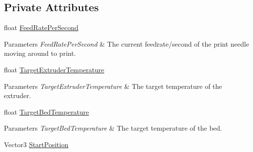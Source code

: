 \subsection*{Private Attributes}
\begin{DoxyCompactItemize}
\item 
\mbox{\label{class_printer_aac6b6291d2af1e4d1e472cf5db639c9b}} 
float \hyperlink{class_printer_aac6b6291d2af1e4d1e472cf5db639c9b}{Feed\+Rate\+Per\+Second}
\begin{DoxyCompactList}\small\item\em 
\begin{DoxyParams}{Parameters}
{\em Feed\+Rate\+Per\+Second} & The current feedrate/second of the print needle moving around to print.\\
\hline
\end{DoxyParams}
\end{DoxyCompactList}\item 
\mbox{\label{class_printer_a6e704bc84d01168b42dd90206b503cf0}} 
float \hyperlink{class_printer_a6e704bc84d01168b42dd90206b503cf0}{Target\+Extruder\+Temperature}
\begin{DoxyCompactList}\small\item\em 
\begin{DoxyParams}{Parameters}
{\em Target\+Extruder\+Temperature} & The target temperature of the extruder.\\
\hline
\end{DoxyParams}
\end{DoxyCompactList}\item 
\mbox{\label{class_printer_a540cd163a03db0b13503a3f459298297}} 
float \hyperlink{class_printer_a540cd163a03db0b13503a3f459298297}{Target\+Bed\+Temperature}
\begin{DoxyCompactList}\small\item\em 
\begin{DoxyParams}{Parameters}
{\em Target\+Bed\+Temperature} & The target temperature of the bed.\\
\hline
\end{DoxyParams}
\end{DoxyCompactList}\item 
\mbox{\label{class_printer_ae1d9793073273a62fb6964617694e7cc}} 
Vector3 \hyperlink{class_printer_ae1d9793073273a62fb6964617694e7cc}{Start\+Position}

\end{DoxyCompactItemize}

